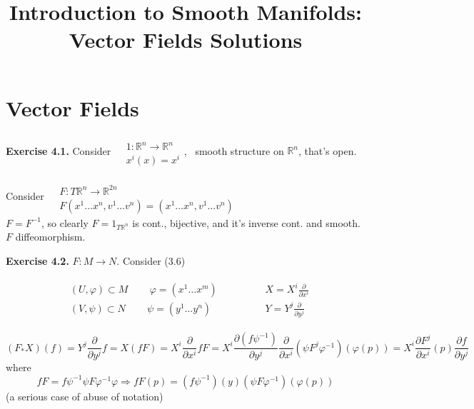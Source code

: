 \documentclass[11pt]{amsart}
\title{Introduction to Smooth Manifolds: Vector Fields Solutions}
\theoremstyle{definition}
\newcommand{\exercisehead}[1]{\medskip\noindent\textbf{Exercise #1.} }
\begin{document}
\maketitle
\section{Vector Fields}

%
%




\exercisehead{4.1}
Consider $ \begin{aligned} & \quad \\
  & 1 : \mathbb{R}^n \to \mathbb{R}^n \\ & x^i(x) = x^i \end{aligned}$, \quad \, smooth structure on $\mathbb{R}^n$, that's open.

Consider $\begin{aligned} & \quad \\
  & F: T\mathbb{R}^n \to \mathbb{R}^{2n} \\
& F(x^1 \dots x^n, v^1 \dots v^n ) = (x^1 \dots x^n, v^1 \dots v^n) \end{aligned}$ \\
$F= F^{-1}$, so clearly $F = 1_{T\mathbb{R}^n} $ is cont., bijective, and it's inverse cont. and smooth.  $F$ diffeomorphism.

\exercisehead{4.2}  $F:M \to N$.  Consider (3.6)

\[
\begin{gathered}
  \begin{aligned}
    & (U , \varphi) \subset M \quad \quad \, \varphi = (x^1 \dots x^m) \\
    & (V, \psi ) \subset N \quad \quad \, \psi = (y^1 \dots y^n)
\end{aligned}  \quad \quad \quad \, \begin{aligned} & X = X^i \frac{ \partial }{ \partial x^i } \\
    & Y = Y^j \frac{ \partial }{ \partial y^j } \end{aligned}
\end{gathered}
\]

\[
(F_* X)(f) = Y^j \frac{ \partial }{ \partial y^j} f = X(fF) = X^i \frac{ \partial }{ \partial x^i } fF = X^i \frac{ \partial (f\psi^{-1})}{ \partial y^j} \frac{ \partial }{ \partial x^i } (\psi F^j \varphi^{-1})(\varphi(p)) = X^i \frac{ \partial F^j}{ \partial x^i }(p) \frac{ \partial f}{ \partial y^j}
\]
where
\[
fF = f\psi^{-1} \psi F\varphi^{-1} \varphi \Longrightarrow fF(p) = (f\psi^{-1})(y) (\psi F\varphi^{-1})(\varphi(p))
\]
(a serious case of abuse of notation)
\end{document}
